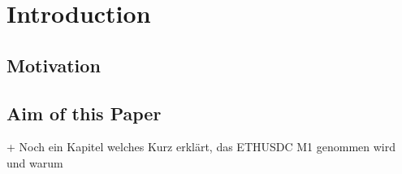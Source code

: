 \section{Introduction}

\subsection{Motivation}

\subsection{Aim of this Paper}

+ Noch ein Kapitel welches Kurz erklärt, das ETHUSDC M1 genommen wird und warum